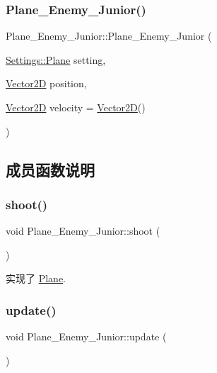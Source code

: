\subsubsection{\texorpdfstring{Plane\+\_\+\+Enemy\+\_\+\+Junior()}{Plane\_Enemy\_Junior()}}
{\footnotesize\ttfamily Plane\+\_\+\+Enemy\+\_\+\+Junior\+::\+Plane\+\_\+\+Enemy\+\_\+\+Junior (\begin{DoxyParamCaption}\item[{\hyperlink{struct_settings_1_1_plane}{Settings\+::\+Plane}}]{setting,  }\item[{\hyperlink{_vector2_d_8hpp_aa1f1145650f1dd9bddf7335ec6434d7c}{Vector2D}}]{position,  }\item[{\hyperlink{_vector2_d_8hpp_aa1f1145650f1dd9bddf7335ec6434d7c}{Vector2D}}]{velocity = {\ttfamily \hyperlink{_vector2_d_8hpp_aa1f1145650f1dd9bddf7335ec6434d7c}{Vector2D}()} }\end{DoxyParamCaption})}



\subsection{成员函数说明}
\mbox{\label{class_plane___enemy___junior_ac9c3559aa4616f1b1efbe4a055fca0ac}} 
\subsubsection{\texorpdfstring{shoot()}{shoot()}}
{\footnotesize\ttfamily void Plane\+\_\+\+Enemy\+\_\+\+Junior\+::shoot (\begin{DoxyParamCaption}{ }\end{DoxyParamCaption})\hspace{0.3cm}{\ttfamily [virtual]}}



实现了 \hyperlink{class_plane_af999499b5e79309d94004e8d012fe9c4}{Plane}.

\mbox{\label{class_plane___enemy___junior_a686e46c9927793dd07235cac72d52405}} 
\subsubsection{\texorpdfstring{update()}{update()}}
{\footnotesize\ttfamily void Plane\+\_\+\+Enemy\+\_\+\+Junior\+::update (\begin{DoxyParamCaption}{ }\end{DoxyParamCaption})\hspace{0.3cm}{\ttfamily [virtual]}}



